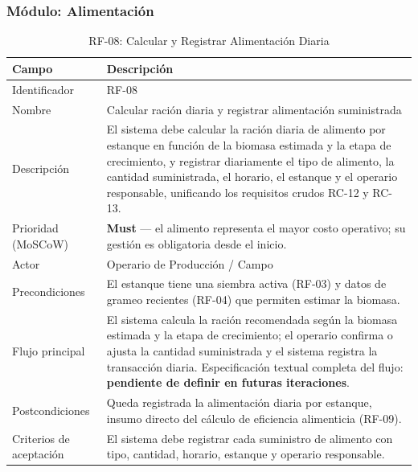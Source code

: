 \documentclass[12pt,a4paper]{article}
\begin{document}
\subsubsection{Módulo: Alimentación}

\begin{table}[H]
\centering
\caption{RF-08: Calcular y Registrar Alimentación Diaria}
\begin{tabular}{|p{3.6cm}|p{10.4cm}|}
\hline
\textbf{Campo} & \textbf{Descripción} \\
\hline
Identificador & RF-08 \\ \hline
Nombre & Calcular ración diaria y registrar alimentación suministrada \\ \hline
Descripción & El sistema debe calcular la ración diaria de alimento por
estanque en función de la biomasa estimada y la etapa de crecimiento, y
registrar diariamente el tipo de alimento, la cantidad suministrada, el
horario, el estanque y el operario responsable, unificando los requisitos
crudos RC-12 y RC-13. \\ \hline
Prioridad (MoSCoW) & \textbf{Must} --- el alimento representa el mayor costo
operativo; su gestión es obligatoria desde el inicio. \\ \hline
Actor & Operario de Producción / Campo \\ \hline
Precondiciones & El estanque tiene una siembra activa (RF-03) y datos de
grameo recientes (RF-04) que permiten estimar la biomasa. \\ \hline
Flujo principal & El sistema calcula la ración recomendada según la biomasa
estimada y la etapa de crecimiento; el operario confirma o ajusta la cantidad
suministrada y el sistema registra la transacción diaria. Especificación
textual completa del flujo: \textbf{pendiente de definir en futuras
iteraciones}. \\ \hline
Postcondiciones & Queda registrada la alimentación diaria por estanque,
insumo directo del cálculo de eficiencia alimenticia (RF-09). \\ \hline
Criterios de aceptación & El sistema debe registrar cada suministro de
alimento con tipo, cantidad, horario, estanque y operario responsable. \\ \hline
\end{tabular}
\end{table}
\end{document}
